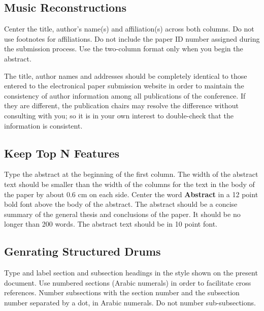 \documentclass[11pt,a4paper]{article}
\begin{document}
\subsection{Music Reconstructions}
\label{ssec:first}

Center the title, author's name(s) and affiliation(s) across both
columns. Do not use footnotes for affiliations. Do not include the
paper ID number assigned during the submission process. Use the
two-column format only when you begin the abstract.

The title, author names and addresses should be completely identical
to those entered to the electronical paper submission website in order
to maintain the consistency of author information among all
publications of the conference. If they are different, the publication
chairs may resolve the difference without consulting with you; so it
is in your own interest to double-check that the information is
consistent.

\subsection{Keep Top N Features }

Type the abstract at the beginning of the first
column. The width of the abstract text should be smaller than the
width of the columns for the text in the body of the paper by about
0.6 cm on each side. Center the word \textbf{Abstract} in a 12 point bold
font above the body of the abstract. The abstract should be a concise
summary of the general thesis and conclusions of the paper. It should
be no longer than 200 words. The abstract text should be in 10 point font.



\subsection{Genrating Structured Drums}

Type and label section and subsection headings in the
style shown on the present document.  Use numbered sections (Arabic
numerals) in order to facilitate cross references. Number subsections
with the section number and the subsection number separated by a dot,
in Arabic numerals.
Do not number sub-subsections.
\end{document}
